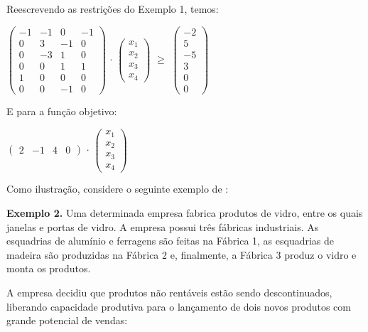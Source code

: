 Reescrevendo as restrições do Exemplo 1, temos:

\begin{center}
$\begin{pmatrix} 
-1 & -1 & 0  & -1 \\ 
 0 &  3 & -1 &  0 \\
 0 & -3 &  1 &  0 \\
 0 &  0 &  1 &  1 \\
 1 &  0 &  0 &  0 \\
 0 &  0 & -1 &  0 
\end{pmatrix}$ 
$\cdot $ 
$\begin{pmatrix} x_1 \\ x_2 \\ x_3 \\ x_4\end{pmatrix}$ 
$\geq$
$\begin{pmatrix} -2 \\ 5 \\ -5\\ 3 \\ 0 \\ 0\end{pmatrix}$
\end{center}

E para a função objetivo:

\begin{center}
$\begin{pmatrix} 2 & -1 & 4 & 0\end{pmatrix}$
$\cdot $ 
$\begin{pmatrix} x_1 \\ x_2 \\ x_3 \\ x_4\end{pmatrix}$ 
\end{center}

Como ilustração, considere o seguinte exemplo de :

	\textbf{Exemplo 2.} Uma determinada empresa fabrica produtos de vidro, entre os quais janelas e portas de vidro. A empresa possui três fábricas industriais. As esquadrias de alumínio e ferragens são feitas na Fábrica 1, as esquadrias de madeira são produzidas na Fábrica 2 e, finalmente, a Fábrica 3 produz o vidro e monta os produtos. 

A empresa decidiu que produtos não rentáveis estão sendo descontinuados, liberando capacidade produtiva para o lançamento de dois novos produtos com grande potencial de vendas:

